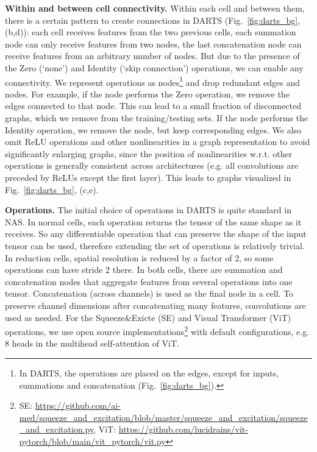 \textbf{Within and between cell connectivity.}
Within each cell and between them, there is a certain pattern to create connections in DARTS (Fig.~\ref{fig:darts_bg}, (b,d)): each cell receives features from the two previous cells, each summation node can only receive features from two nodes, the last concatenation node can receive features from an arbitrary number of nodes. But due to the presence of the Zero (`none') and Identity (`skip connection') operations, we can enable any connectivity. 
We represent operations as nodes\footnote{In DARTS, the operations are placed on the edges, except for inputs, summations and concatenation (Fig.~\ref{fig:darts_bg}).} and drop redundant edges and nodes. For example, if the node performs the Zero operation, we remove the edges connected to that node. This can lead to a small fraction of disconnected graphs, which we remove from the training/testing sets. If the node performs the Identity operation, we remove the node, but keep corresponding edges. 
We also omit ReLU operations and other nonlinearities in a graph representation to avoid significantly enlarging graphs, since the position of nonlinearities w.r.t. other operations is generally consistent across architectures (e.g. all convolutions are preceded by ReLUs except the first layer).
This leads to graphs visualized in Fig.~\ref{fig:darts_bg}, (c,e).

\textbf{Operations.} The initial choice of operations in DARTS is quite standard in NAS. In normal cells, each operation returns the tensor of the same shape as it receives. So any differentiable operation that can preserve the shape of the input tensor can be used, therefore extending the set of operations is relatively trivial. In reduction cells, spatial resolution is reduced by a factor of 2, so some operations can have stride 2 there. In both cells, there are summation and concatenation nodes that aggregate features from several operations into one tensor. Concatenation (across channels) is used as the final node in a cell. To preserve channel dimensions after concatenating many features,  convolutions are used as needed.
For the Squeeze\&Exicte (SE) and Visual Transformer (ViT) operations, we use open source implementations\footnote{SE: \url{https://github.com/ai-med/squeeze_and_excitation/blob/master/squeeze_and_excitation/squeeze_and_excitation.py}, ViT: \url{https://github.com/lucidrains/vit-pytorch/blob/main/vit_pytorch/vit.py}} with default configurations, e.g. 8 heads in the multihead self-attention of ViT.



